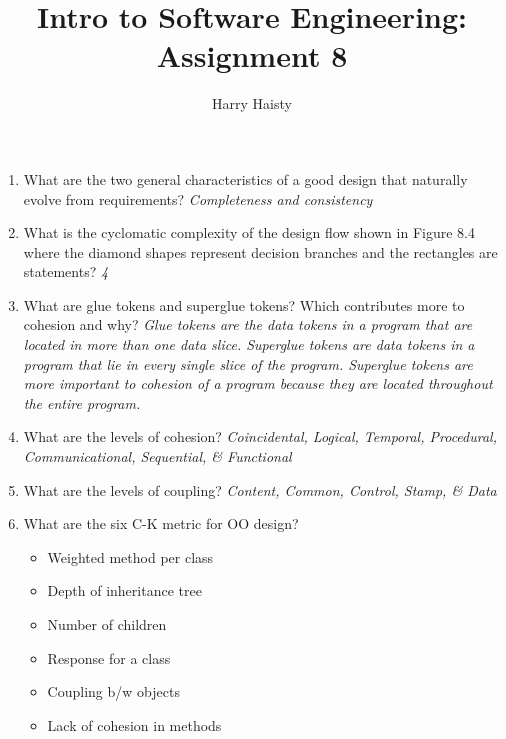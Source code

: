 \documentclass[11pt]{article}
\title{Intro to Software Engineering: Assignment 8}
\author{Harry Haisty}
\begin{document}
    \maketitle
    \begin{enumerate}
        \item What are the two general characteristics of a good design that naturally evolve from requirements?
        \newline
        \textit{Completeness and consistency}
        
        \item What is the cyclomatic complexity of the design flow shown in Figure 8.4 where the diamond shapes represent decision branches and the rectangles are statements?
        \newline
        \textit{4}
        
        \item What are glue tokens and superglue tokens? Which contributes more to cohesion and why?
        \newline
        \textit{Glue tokens are the data tokens in a program that are located in more than one data slice. Superglue tokens are data tokens in a program that lie in every single slice of the program. Superglue tokens are more important to cohesion of a program because they are located throughout the entire program.}
        
        \item What are the levels of cohesion?
        \newline
        \textit{Coincidental, Logical, Temporal, Procedural, Communicational, Sequential, \& Functional}
        
        \item What are the levels of coupling?
        \newline
        \textit{Content, Common, Control, Stamp, \& Data}
        
        \item What are the six C-K metric for OO design?
        \begin{itemize}
            \item Weighted method per class
            \item Depth of inheritance tree
            \item Number of children
            \item Response for a class
            \item Coupling b/w objects
            \item Lack of cohesion in methods
        \end{itemize}
        

\end{enumerate}
\end{document}
